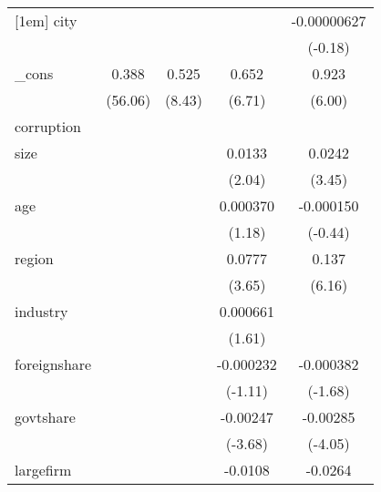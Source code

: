 {\begin{tabular}{l*{4}{c}}
[1em]
city        &                     &                     &                     & -0.00000627         \\
            &                     &                     &                     &     (-0.18)         \\
[1em]
\_cons      &       0.388\sym{***}&       0.525\sym{***}&       0.652\sym{***}&       0.923\sym{***}\\
            &     (56.06)         &      (8.43)         &      (6.71)         &      (6.00)         \\
\hline
corruption  &                     &                     &                     &                     \\
size        &                     &                     &      0.0133\sym{*}  &      0.0242\sym{***}\\
            &                     &                     &      (2.04)         &      (3.45)         \\
[1em]
age         &                     &                     &    0.000370         &   -0.000150         \\
            &                     &                     &      (1.18)         &     (-0.44)         \\
[1em]
region      &                     &                     &      0.0777\sym{***}&       0.137\sym{***}\\
            &                     &                     &      (3.65)         &      (6.16)         \\
[1em]
industry    &                     &                     &    0.000661         &                     \\
            &                     &                     &      (1.61)         &                     \\
[1em]
foreignshare&                     &                     &   -0.000232         &   -0.000382         \\
            &                     &                     &     (-1.11)         &     (-1.68)         \\
[1em]
govtshare   &                     &                     &    -0.00247\sym{***}&    -0.00285\sym{***}\\
            &                     &                     &     (-3.68)         &     (-4.05)         \\
[1em]
largefirm   &                     &                     &     -0.0108         &     -0.0264         \\

\end{tabular}}
